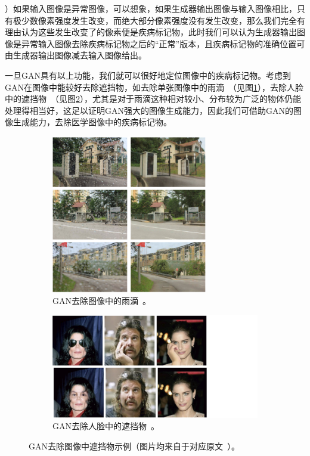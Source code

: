 ）如果输入图像是异常图像，可以想象，如果生成器输出图像与输入图像相比，只有极少数像素强度发生改变，而绝大部分像素强度没有发生改变，那么我们完全有理由认为这些发生改变了的像素便是疾病标记物，此时我们可以认为生成器输出图像是异常输入图像去除疾病标记物之后的“正常”版本，且疾病标记物的准确位置可由生成器输出图像减去输入图像给出。

\noindent 一旦GAN具有以上功能，我们就可以很好地定位图像中的疾病标记物。考虑到GAN在图像中能较好去除遮挡物，如去除单张图像中的雨滴~\cite{qian2018attentive}（见图\ref{subfig:attention_gan}），去除人脸中的遮挡物~\cite{yuan2019face}（见图\ref{subfig:face_de_occulusion}），尤其是对于雨滴这种相对较小、分布较为广泛的物体仍能处理得相当好，这足以证明GAN强大的图像生成能力，因此我们可借助GAN的图像生成能力，去除医学图像中的疾病标记物。
\begin{figure}[h!]
	\begin{subfigure}{0.45\textwidth}
		\centering
		\includegraphics[width=0.75\textwidth]{figure/attention_gan_example.png}
		\caption{GAN去除图像中的雨滴~\cite{qian2018attentive}。}
		\label{subfig:attention_gan}
	\end{subfigure}
	\begin{subfigure}{0.45\textwidth}
		\centering
		\includegraphics[width=1.5\textwidth]{figure/face_de_occulusion.png}
		\caption{GAN去除人脸中的遮挡物~\cite{yuan2019face}。}
		\label{subfig:face_de_occulusion}
	\end{subfigure}
	\caption[GAN去除图像中遮挡物示例]{GAN去除图像中遮挡物示例（图片均来自于对应原文~\cite{qian2018attentive,yuan2019face}）。}
	\label{mul_fig:gan_auto_encoder_example}
\end{figure}

